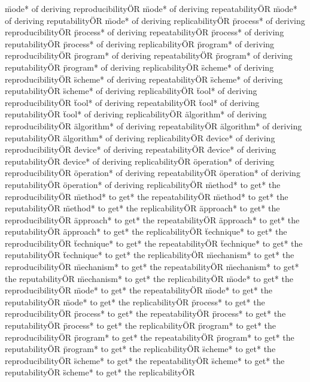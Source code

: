 \documentclass[
10pt, %
a4paper, %
oneside, %
headinclude,footinclude, %
BCOR5mm, %
]{scrartcl}
\begin{document}
\"mode* of deriving reproducibility\" OR \"mode* of deriving repeatability\" OR \"mode* of deriving reputability\" OR \"mode* of deriving replicability\" OR 
\"process* of deriving reproducibility\" OR \"process* of deriving repeatability\" OR \"process* of deriving reputability\" OR \"process* of deriving replicability\" OR 
\"program* of deriving reproducibility\" OR \"program* of deriving repeatability\" OR \"program* of deriving reputability\" OR \"program* of deriving replicability\" OR 
\"scheme* of deriving reproducibility\" OR \"scheme* of deriving repeatability\" OR \"scheme* of deriving reputability\" OR \"scheme* of deriving replicability\" OR 
\"tool* of deriving reproducibility\" OR \"tool* of deriving repeatability\" OR \"tool* of deriving reputability\" OR \"tool* of deriving replicability\" OR 
\"algorithm* of deriving reproducibility\" OR \"algorithm* of deriving repeatability\" OR \"algorithm* of deriving reputability\" OR \"algorithm* of deriving replicability\" OR 
\"device* of deriving reproducibility\" OR \"device* of deriving repeatability\" OR \"device* of deriving reputability\" OR \"device* of deriving replicability\" OR 
\"operation* of deriving reproducibility\" OR \"operation* of deriving repeatability\" OR \"operation* of deriving reputability\" OR \"operation* of deriving replicability\" OR 
\"method* to get* the reproducibility\" OR \"method* to get* the repeatability\" OR \"method* to get* the reputability\" OR \"method* to get* the replicability\" OR 
\"approach* to get* the reproducibility\" OR \"approach* to get* the repeatability\" OR \"approach* to get* the reputability\" OR \"approach* to get* the replicability\" OR 
\"technique* to get* the reproducibility\" OR \"technique* to get* the repeatability\" OR \"technique* to get* the reputability\" OR \"technique* to get* the replicability\" OR 
\"mechanism* to get* the reproducibility\" OR \"mechanism* to get* the repeatability\" OR \"mechanism* to get* the reputability\" OR \"mechanism* to get* the replicability\" OR 
\"mode* to get* the reproducibility\" OR \"mode* to get* the repeatability\" OR \"mode* to get* the reputability\" OR \"mode* to get* the replicability\" OR 
\"process* to get* the reproducibility\" OR \"process* to get* the repeatability\" OR \"process* to get* the reputability\" OR \"process* to get* the replicability\" OR 
\"program* to get* the reproducibility\" OR \"program* to get* the repeatability\" OR \"program* to get* the reputability\" OR \"program* to get* the replicability\" OR 
\"scheme* to get* the reproducibility\" OR \"scheme* to get* the repeatability\" OR \"scheme* to get* the reputability\" OR \"scheme* to get* the replicability\" OR 
\end{document}
